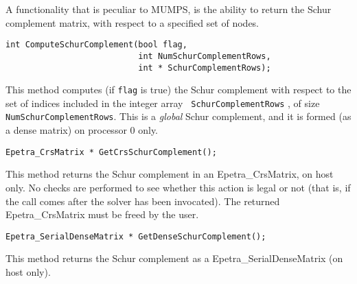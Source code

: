 \documentclass[11pt]{SANDreport}
\begin{document}
\bigskip
  
A functionality that is peculiar to MUMPS, is the ability to return
the Schur complement matrix, with respect to a specified set of nodes.

\begin{verbatim}
int ComputeSchurComplement(bool flag,
                           int NumSchurComplementRows, 
                           int * SchurComplementRows);
\end{verbatim}
This method computes (if \verb!flag! is true) the Schur complement with
respect to the set of indices included in the integer array {\tt
  SchurComplementRows} , of size {\tt NumSchurComplementRows}. This is a
{\sl global} Schur complement, and it is formed (as a dense matrix) on
processor 0 only.

\medskip

\begin{verbatim}
Epetra_CrsMatrix * GetCrsSchurComplement();
\end{verbatim}
This method returns the Schur complement in an Epetra\_CrsMatrix, on host
only. No checks are performed to see whether this action is legal or not
(that is, if the call comes after the solver has been invocated).
The returned Epetra\_CrsMatrix must be freed by the user.

\medskip

\begin{verbatim}
Epetra_SerialDenseMatrix * GetDenseSchurComplement();
\end{verbatim}
This method returns the Schur complement as a Epetra\_SerialDenseMatrix
(on host only).

\medskip
\end{document}
